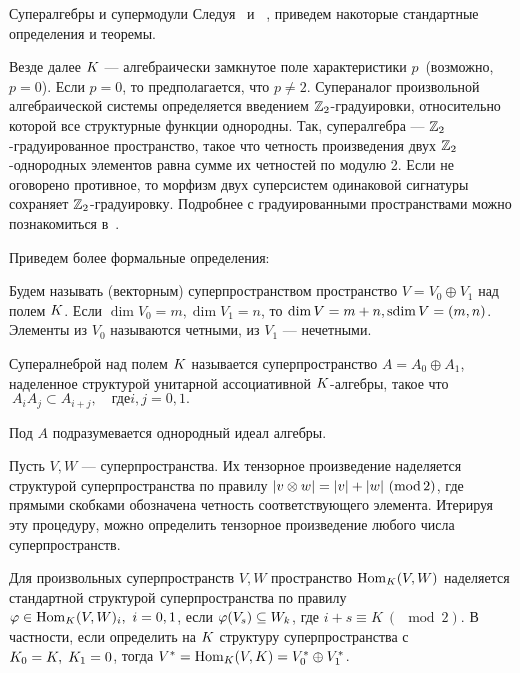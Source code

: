 \begin{subsection}{Супералгебры и супермодули}\label{superalgebras}
  Следуя~\cite{kleshchev} и ~\cite{some_properties_supergroups},
  приведем накоторые стандартные определения и теоремы.
  \newline

  Везде далее $ K $ --- алгебраически замкнутое поле характеристики
  $ p $~(возможно, $ p = 0 $). Если $ p = 0 $, то предполагается, что $ p \neq 2 $.
  Супераналог произвольной алгебраической системы определяется введением
  $\mathbb{Z}_2$-градуировки, относительно которой все структурные функции однородны.
  Так, супералгебра --- $\mathbb{Z}_2$-градуированное пространство, такое что
  четность произведения двух $\mathbb{Z}_2$-однородных элементов равна сумме их четностей
  по модулю 2. Если не оговорено противное, то морфизм двух суперсистем
  одинаковой сигнатуры сохраняет $\mathbb{Z}_2$-градуировку. Подробнее с градуированными
  пространствами можно познакомиться в~\cite{arjantsev}.

  Приведем более формальные определения:
  \begin{definition}
    Будем называть (векторным) суперпространством пространство $ V = V_0 \oplus V_1 $
    над полем $ K $. Если $ \dim V_0 = m, \dim V_1 = n $, то $ \dim V = m + n,
    \mathrm{sdim\,} V = (m, n) $. Элементы из $ V_0 $ называются четными, из $ V_1 $ --- нечетными.
  \end{definition}
  \begin{definition}
    Супералнеброй над полем $ K $ называется суперпространство 
    $ A = A_0 \oplus A_1 $, наделенное структурой унитарной ассоциативной
    $K$-алгебры, такое что $ ~A_i A_j \subset A_{i+j}, \quad \text{где} i, j = 0, 1. $
  \end{definition}
  Под  $ A $ подразумевается однородный идеал алгебры.

  Пусть $ V, W $ --- суперпространства. Их тензорное произведение
  наделяется структурой суперпространства по правилу $ |v \otimes w| = |v| + |w| ~(\mathrm{mod}\, 2) $,
  где прямыми скобками обозначена четность соответствующего элемента. Итерируя
  эту процедуру, можно определить тензорное произведение любого числа суперпространств.

  Для произвольных суперпространств $ V, W $ пространство $ \mathrm{Hom}_{K}(V, W) $
  наделяется стандартной структурой суперпространства по правилу
  $ \varphi \in \mathrm{Hom}_{K}(V, W)_i,~i = 0, 1 $, если $ \varphi(V_s) \subseteq W_k $, где
  $ i + s \equiv K~(\mod 2) $. В частности, если определить на $ K $ структуру
  суперпространства с $ K_0 = K, \;K_1 = 0 $, тогда
  $ V^* = \mathrm{Hom}_{K}(V, K) = V_0^* \oplus V_1^* $.


\end{subsection}
